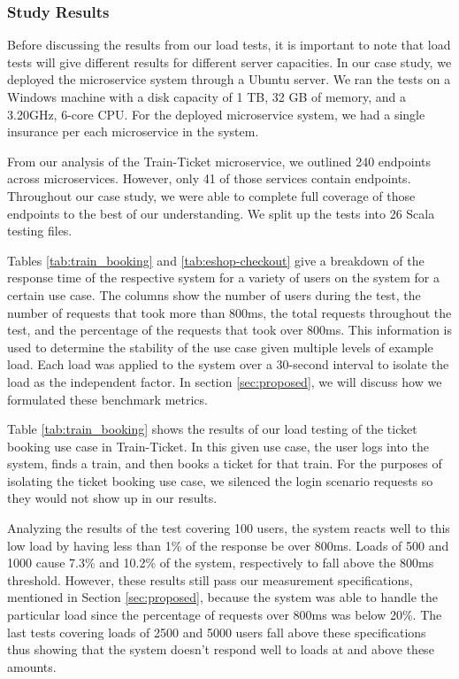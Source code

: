 \subsubsection{Study Results}

Before discussing the results from our load tests, it is important to note that load tests will give different results for different server capacities. In our case study, we deployed the microservice system through a Ubuntu server. We ran the tests on a Windows machine with a disk capacity of 1 TB, 32 GB of memory, and a 3.20GHz, 6-core CPU. For the deployed microservice system, we had a single insurance per each microservice in the system.

From our analysis of the Train-Ticket microservice, we outlined 240 endpoints across microservices. However, only 41 of those services contain endpoints. Throughout our case study, we were able to complete full coverage of those endpoints to the best of our understanding. We split up the tests into 26 Scala testing files. 

Tables \ref{tab:train_booking} and \ref{tab:eshop-checkout} give a breakdown of the response time of the respective system for a variety of users on the system for a certain use case. The columns show the number of users during the test, the number of requests that took more than 800ms, the total requests throughout the test, and the percentage of the requests that took over 800ms. This information is used to determine the stability of the use case given multiple levels of example load. Each load was applied to the system over a 30-second interval to isolate the load as the independent factor. In section \ref{sec:proposed}, we will discuss how we formulated these benchmark metrics.

Table \ref{tab:train_booking} shows the results of our load testing of the ticket booking use case in Train-Ticket. In this given use case, the user logs into the system, finds a train, and then books a ticket for that train. For the purposes of isolating the ticket booking use case, we silenced the login scenario requests so they would not show up in our results. 

Analyzing the results of the test covering 100 users, the system reacts well to this low load by having less than 1\% of the response be over 800ms. Loads of 500 and 1000 cause 7.3\% and 10.2\% of the system, respectively to fall above the 800ms threshold. However, these results still pass our measurement specifications, mentioned in Section \ref{sec:proposed}, because the system was able to handle the particular load since the percentage of requests over 800ms was below 20\%. The last tests covering loads of 2500 and 5000 users fall above these specifications thus showing that the system doesn't respond well to loads at and above these amounts.

